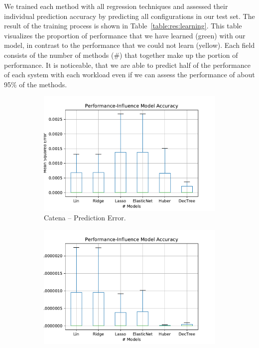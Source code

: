 We trained each method with all regression techniques and assessed their individual prediction accuracy by predicting all configurations in our test set. The result of the training process is shown in Table~\ref{table:res:learning}. This table visualizes the proportion of performance that we have learned (green) with our model, in contrast to the performance that we could not learn (yellow). Each field consists of the number of methods (\#) that together make up the portion of performance. It is noticeable, that we are able to predict half of the performance of each system with each workload even if we can assess the performance of about 95\% of the methods. 

\begin{figure}[h]
	\centering
	\begin{subfigure}{.49\textwidth}
	  \centering
	  \includegraphics[width=\textwidth]{images/Catena_box_regression_model_overview_without_outl}
	  \caption{Catena -- Prediction Error.}
	  \label{box_model_cross_comp_catena}
	\end{subfigure}
	\begin{subfigure}{.49\textwidth}
	  \centering
	  \includegraphics[width=\textwidth]{images/H2_box_regression_model_overview_without_outl}

\end{subfigure}
\end{figure}
